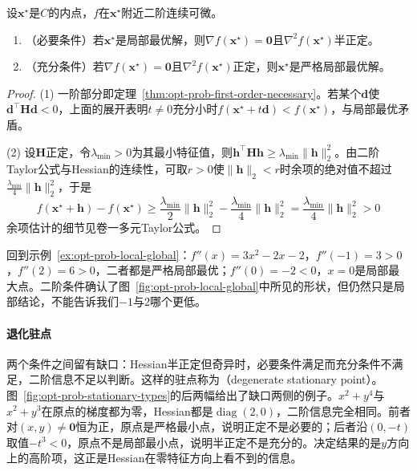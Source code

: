 \begin{theorem}[二阶条件]
\label{thm:opt-prob-second-order}
设$\bm x^\star$是$C$的内点，$f$在$\bm x^\star$附近二阶连续可微。
\begin{enumerate}
  \item （必要条件）若$\bm x^\star$是局部最优解，则$\nabla f(\bm x^\star)=\bm 0$且$\nabla^2f(\bm x^\star)$半正定。
  \item （充分条件）若$\nabla f(\bm x^\star)=\bm 0$且$\nabla^2f(\bm x^\star)$正定，则$\bm x^\star$是严格局部最优解。
\end{enumerate}
\end{theorem}

\begin{proof}
(1) 一阶部分即定理~\ref{thm:opt-prob-first-order-necessary}。若某个$\bm d$使$\bm d^\top\bm H\bm d<0$，上面的展开表明$t\neq0$充分小时$f(\bm x^\star+t\bm d)<f(\bm x^\star)$，与局部最优矛盾。

(2) 设$\bm H$正定，令$\lambda_{\min}>0$为其最小特征值，则$\bm h^\top\bm H\bm h\geq\lambda_{\min}\lVert\bm h\rVert_2^2$。由二阶Taylor公式与Hessian的连续性，可取$r>0$使$\lVert\bm h\rVert_2<r$时余项的绝对值不超过$\frac{\lambda_{\min}}{4}\lVert\bm h\rVert_2^2$，于是
\[
  f(\bm x^\star+\bm h)-f(\bm x^\star)\geq\frac{\lambda_{\min}}{2}\lVert\bm h\rVert_2^2-\frac{\lambda_{\min}}{4}\lVert\bm h\rVert_2^2=\frac{\lambda_{\min}}{4}\lVert\bm h\rVert_2^2>0
\]
余项估计的细节见卷一多元Taylor公式。
\end{proof}

回到示例~\ref{ex:opt-prob-local-global}：$f''(x)=3x^2-2x-2$，$f''(-1)=3>0$，$f''(2)=6>0$，二者都是严格局部最优；$f''(0)=-2<0$，$x=0$是局部最大点。二阶条件确认了图~\ref{fig:opt-prob-local-global}中所见的形状，但仍然只是局部结论，不能告诉我们$-1$与$2$哪个更低。

\paragraph{退化驻点}
两个条件之间留有缺口：Hessian半正定但奇异时，必要条件满足而充分条件不满足，二阶信息不足以判断。这样的驻点称为（degenerate stationary point）。图~\ref{fig:opt-prob-stationary-types}的后两幅给出了缺口两侧的例子。$x^2+y^4$与$x^2+y^3$在原点的梯度都为零，Hessian都是$\operatorname{diag}(2,0)$，二阶信息完全相同。前者对$(x,y)\neq\bm 0$恒为正，原点是严格最小点，说明正定不是必要的；后者沿$(0,-t)$取值$-t^3<0$，原点不是局部最小点，说明半正定不是充分的。决定结果的是$y$方向上的高阶项，这正是Hessian在零特征方向上看不到的信息。

